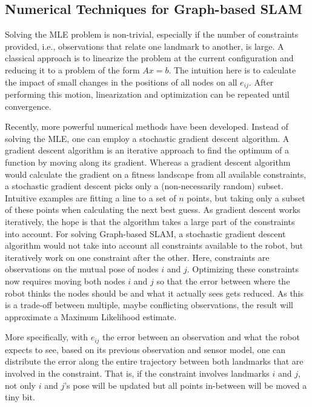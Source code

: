 \subsection{Numerical Techniques for Graph-based SLAM}
Solving the MLE problem is non-trivial, especially if the number of constraints provided, i.e., observations that relate one landmark to another, is large. A classical approach is to linearize the problem at the current configuration and reducing it to a problem of the form $ Ax=b$. The intuition here is to calculate the impact of small changes in the positions of all nodes on all $ e_{ij}$. After performing this motion, linearization and optimization can be  repeated until convergence. 

Recently, more powerful numerical methods have been developed. Instead of solving the MLE, one can employ a stochastic gradient descent algorithm. A gradient descent algorithm is an iterative approach to find the optimum of a function by moving along its gradient. Whereas a gradient descent algorithm would calculate the gradient on a fitness landscape from all available constraints, a stochastic gradient descent picks only a (non-necessarily random) subset. Intuitive examples are fitting a line to a set of $n$ points, but taking only a subset of these points when calculating the next best guess. As gradient descent works iteratively, the hope is that the algorithm takes a large part of the constraints into account. For solving Graph-based SLAM, a stochastic gradient descent algorithm would not take into account all constraints available to the robot, but  iteratively work on one constraint after the other. Here, constraints are observations on the mutual pose of nodes $i$ and $j$. Optimizing these constraints now requires moving both nodes $i$ and $j$ so that the error between where the robot thinks the nodes should be and what it actually sees gets reduced.  As this is a trade-off between multiple, maybe conflicting observations, the result will approximate a Maximum Likelihood estimate.

More specifically, with $ e_{ij}$ the error between an observation and what the robot expects to see, based on its previous observation and sensor model, one can distribute the error along the entire trajectory between both landmarks that are involved in the constraint. That is, if the constraint involves landmarks $i$ and $j$, not only $i$ and $j$'s pose will be updated but all points in-between will be moved a tiny bit.


